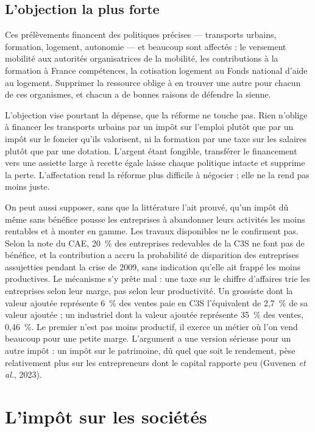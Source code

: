 \documentclass[11pt,a4paper]{article}
\begin{document}
\subsection{L'objection la plus forte}

Ces prélèvements financent des politiques précises --- transports urbains, formation, logement,
autonomie --- et beaucoup sont affectés : le versement mobilité aux autorités organisatrices de la
mobilité, les contributions à la formation à France compétences, la cotisation logement au Fonds
national d'aide au logement. Supprimer la ressource oblige à en trouver une autre pour chacun de
ces organismes, et chacun a de bonnes raisons de défendre la sienne.

L'objection vise pourtant la dépense, que la réforme ne touche pas. Rien n'oblige à financer les
transports urbains par un impôt sur l'emploi plutôt que par un impôt sur le foncier qu'ils
valorisent, ni la formation par une taxe sur les salaires plutôt que par une dotation. L'argent
étant fongible, transférer le financement vers une assiette large à recette égale laisse chaque
politique intacte et supprime la perte. L'affectation rend la réforme plus difficile à négocier ;
elle ne la rend pas moins juste.

On peut aussi supposer, sans que la littérature l'ait prouvé, qu'un impôt dû même sans bénéfice
pousse les entreprises à abandonner leurs activités les moins rentables et à monter en gamme. Les
travaux disponibles ne le confirment pas. Selon la note du CAE, 20~\% des entreprises redevables de
la C3S ne font pas de bénéfice, et la contribution a accru la probabilité de disparition des
entreprises assujetties pendant la crise de 2009, sans indication qu'elle ait frappé les moins
productives. Le mécanisme s'y prête mal : une taxe sur le chiffre d'affaires trie les entreprises
selon leur marge, pas selon leur productivité. Un grossiste dont la valeur ajoutée représente 6~\%
des ventes paie en C3S l'équivalent de 2,7~\% de sa valeur ajoutée ; un industriel dont la valeur
ajoutée représente 35~\% des ventes, 0,46~\%. Le premier n'est pas moins productif, il exerce un
métier où l'on vend beaucoup pour une petite marge. L'argument a une version sérieuse pour un autre
impôt : un impôt sur le patrimoine, dû quel que soit le rendement, pèse relativement plus sur les
entrepreneurs dont le capital rapporte peu (Guvenen \emph{et al.}, 2023).

\section{L'impôt sur les sociétés}
\end{document}
